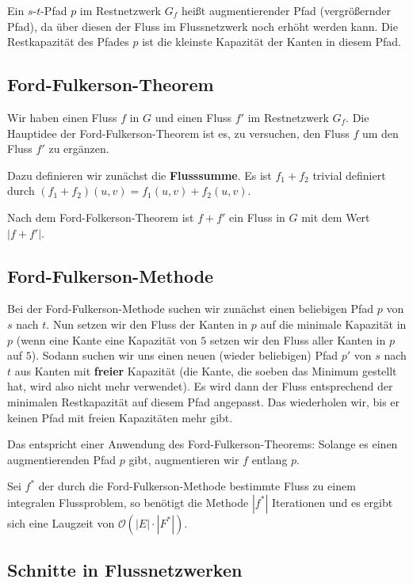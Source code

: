 \documentclass[12pt]{article}
\begin{document}
Ein $s$-$t$-Pfad $p$ im Restnetzwerk $G_f$ heißt augmentierender Pfad (vergrößernder Pfad), da über diesen der Fluss im Flussnetzwerk noch erhöht werden kann. Die Restkapazität des Pfades $p$ ist die kleinste Kapazität der Kanten in diesem Pfad.

\subsection{Ford-Fulkerson-Theorem}

Wir haben einen Fluss $f$ in $G$ und einen Fluss $f'$ im Restnetzwerk $G_f$. Die Hauptidee der Ford-Fulkerson-Theorem ist es, zu versuchen, den Fluss $f$ um den Fluss $f'$ zu ergänzen.

Dazu definieren wir zunächst die \textbf{Flusssumme}. Es ist $f_1 + f_2$ trivial definiert durch $(f_1+f_2)(u,v) = f_1(u,v)+f_2(u,v)$.

Nach dem Ford-Folkerson-Theorem ist $f + f'$ ein Fluss in $G$ mit dem Wert $|f + f'|$.

\subsection{Ford-Fulkerson-Methode}

Bei der Ford-Fulkerson-Methode suchen wir zunächst einen beliebigen Pfad $p$ von $s$ nach $t$. Nun setzen wir den Fluss der Kanten in $p$ auf die minimale Kapazität in $p$ (wenn eine Kante eine Kapazität von $5$ setzen wir den Fluss aller Kanten in $p$ auf $5$). Sodann suchen wir uns einen neuen (wieder beliebigen) Pfad $p'$ von $s$ nach $t$ aus Kanten mit \textbf{freier} Kapazität (die Kante, die soeben das Minimum gestellt hat, wird also nicht mehr verwendet). Es wird dann der Fluss entsprechend der minimalen Restkapazität auf diesem Pfad angepasst. Das wiederholen wir, bis er keinen Pfad mit freien Kapazitäten mehr gibt.

Das entspricht einer Anwendung des Ford-Fulkerson-Theorems: Solange es einen augmentierenden Pfad $p$ gibt, augmentieren wir $f$ entlang $p$.

Sei $f^*$ der durch die Ford-Fulkerson-Methode bestimmte Fluss zu einem integralen Flussproblem, so benötigt die Methode $|f^*|$ Iterationen und es ergibt sich eine Laugzeit von $\mathcal O(|E| \cdot |F^*|)$.

\subsection{Schnitte in Flussnetzwerken}
\end{document}
